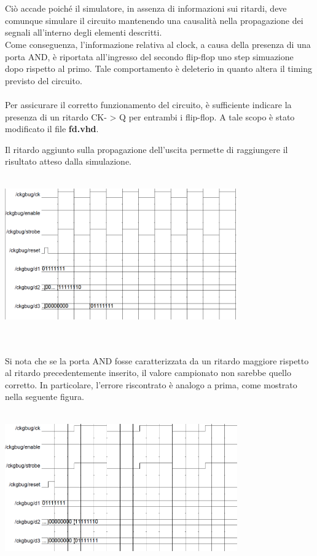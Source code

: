 \documentclass[11pt,  english, makeidx, a4paper, titlepage, oneside]{book}
\newenvironment{listato}{\footnotesize} {\normalsize }
\begin{document}
\\\\
Ciò accade poiché il simulatore, in assenza di informazioni sui ritardi, deve comunque simulare il circuito mantenendo una causalità nella propagazione dei segnali all'interno degli elementi descritti.
\\
Come conseguenza, l'informazione relativa al clock, a causa della presenza di una porta AND, è riportata all'ingresso del secondo flip-flop uno step simuazione dopo rispetto al primo. Tale comportamento è deleterio in quanto altera il timing previsto del circuito.
\\\\
Per assicurare il corretto funzionamento del circuito, è sufficiente indicare la presenza di un ritardo CK- > Q per entrambi i flip-flop. A tale scopo è stato modificato il file \textbf{fd.vhd}.
\begin{center}
\begin{listato}
	\centerline{}
\end{listato}
\end{center}
Il ritardo aggiunto sulla propagazione dell'uscita permette di raggiungere il risultato atteso dalla simulazione.
\\\\
\centerline{\includegraphics[width=10cm]{./img/Lab_3/clk_bug_resolved.png}}
\\\\
Si nota che se la porta AND fosse caratterizzata da un ritardo maggiore rispetto al ritardo precedentemente inserito, il valore campionato non sarebbe quello corretto. In particolare, l'errore riscontrato è analogo a prima, come mostrato nella seguente figura.
\\\\
\centerline{\includegraphics[width=10cm]{./img/Lab_3/clk_bug_delay.png}}
\newpage
\end{document}
